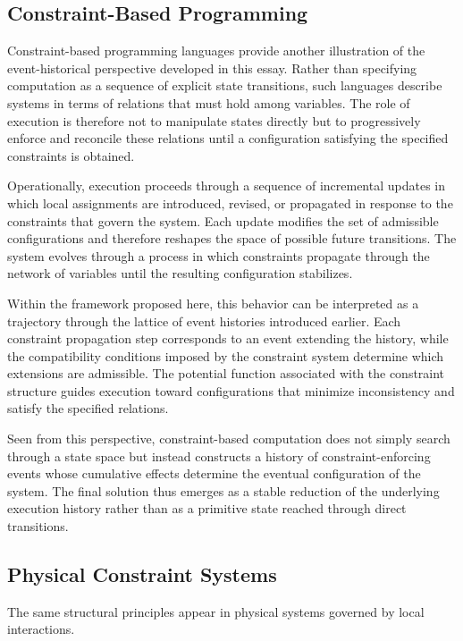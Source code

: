 \documentclass[12pt]{article}
\begin{document}
\subsection{Constraint-Based Programming}

Constraint-based programming languages provide another
illustration of the event-historical perspective developed
in this essay. Rather than specifying computation as a
sequence of explicit state transitions, such languages
describe systems in terms of relations that must hold
among variables. The role of execution is therefore not
to manipulate states directly but to progressively enforce
and reconcile these relations until a configuration
satisfying the specified constraints is obtained.

Operationally, execution proceeds through a sequence of
incremental updates in which local assignments are
introduced, revised, or propagated in response to the
constraints that govern the system. Each update modifies
the set of admissible configurations and therefore
reshapes the space of possible future transitions.
The system evolves through a process in which constraints
propagate through the network of variables until the
resulting configuration stabilizes.

Within the framework proposed here, this behavior can be
interpreted as a trajectory through the lattice of event
histories introduced earlier. Each constraint propagation
step corresponds to an event extending the history, while
the compatibility conditions imposed by the constraint
system determine which extensions are admissible. The
potential function associated with the constraint structure
guides execution toward configurations that minimize
inconsistency and satisfy the specified relations.

Seen from this perspective, constraint-based computation
does not simply search through a state space but instead
constructs a history of constraint-enforcing events whose
cumulative effects determine the eventual configuration
of the system. The final solution thus emerges as a stable
reduction of the underlying execution history rather than
as a primitive state reached through direct transitions.

\subsection{Physical Constraint Systems}

The same structural principles appear in physical
systems governed by local interactions.
\end{document}
